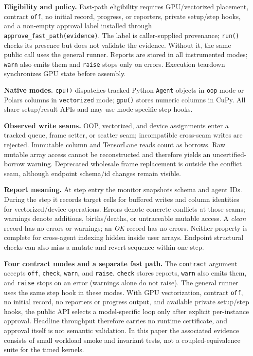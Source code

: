 \documentclass[sigconf,nonacm,review,natbib=true]{acmart}
\theoremstyle{definition}
\theoremstyle{plain}
\theoremstyle{remark}
\begin{document}
\textbf{Eligibility and policy.} Fast-path eligibility requires GPU/vectorized
placement, contract \texttt{off}, no initial record, progress, or reporters,
private setup/step hooks, and a non-empty approval label installed through
\texttt{approve\_fast\_path(evidence)}. The label is caller-supplied
provenance; \texttt{run()} checks its presence but does not validate the
evidence. Without it, the same public call uses the general runner. Reports are
stored in all instrumented modes; \texttt{warn} also emits them and
\texttt{raise} stops only on errors. Execution teardown synchronizes GPU state
before assembly.

\textbf{Native modes.} \texttt{cpu()} dispatches tracked Python \texttt{Agent}
objects in \texttt{oop} mode or Polars columns in \texttt{vectorized} mode;
\texttt{gpu()} stores numeric columns in CuPy. All share setup/result APIs and
may use mode-specific step hooks.

\textbf{Observed write seams.} OOP, vectorized, and device assignments enter a
tracked queue, frame setter, or scatter seam; incompatible cross-seam writes are
rejected. Immutable column and TensorLane reads count as borrows. Raw mutable
array access cannot be reconstructed and therefore yields an uncertified-borrow
warning. Deprecated wholesale frame replacement is outside the conflict seam,
although endpoint schema/id changes remain visible.

\textbf{Report meaning.} At step entry the monitor snapshots schema and agent
IDs. During the step it records target cells for buffered writes and column
identities for vectorized/device operations. Errors denote concrete conflicts
at those seams; warnings denote additions, births/deaths, or untraceable mutable
access. A \emph{clean} record has no errors or warnings; an \emph{OK} record has
no errors. Neither property is complete for cross-agent indexing hidden inside
user arrays. Endpoint structural checks can also miss a mutate-and-revert
sequence within one step.

\textbf{Four contract modes and a separate fast path.} The \texttt{contract}
argument accepts \texttt{off}, \texttt{check}, \texttt{warn}, and
\texttt{raise}. \texttt{check} stores reports, \texttt{warn} also emits them,
and \texttt{raise} stops on an error (warnings alone do not raise). The general
runner uses the same step hook in these modes. With GPU vectorization, contract
\texttt{off}, no initial record, no reporters or progress output, and available
private setup/step hooks, the public API selects a model-specific loop only
after explicit per-instance approval. Headline throughput therefore carries no
runtime certificate, and approval itself is not semantic validation. In this
paper the associated evidence consists of small workload smoke and invariant
tests, not a coupled-equivalence suite for the timed kernels.
\end{document}
